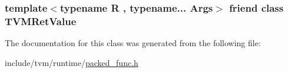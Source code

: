 \subsubsection[{\texorpdfstring{T\+V\+M\+Ret\+Value}{TVMRetValue}}]{\setlength{\rightskip}{0pt plus 5cm}template$<$typename R , typename... Args$>$ friend class {\bf T\+V\+M\+Ret\+Value}\hspace{0.3cm}{\ttfamily [friend]}}\hypertarget{classtvm_1_1runtime_1_1TypedPackedFunc_3_01R_07Args_8_8_8_08_4_ae0ea8b4adc6dab8c74086bceaef6b3e1}{}\label{classtvm_1_1runtime_1_1TypedPackedFunc_3_01R_07Args_8_8_8_08_4_ae0ea8b4adc6dab8c74086bceaef6b3e1}


The documentation for this class was generated from the following file\+:\begin{DoxyCompactItemize}
\item 
include/tvm/runtime/\hyperlink{packed__func_8h}{packed\+\_\+func.\+h}\end{DoxyCompactItemize}

